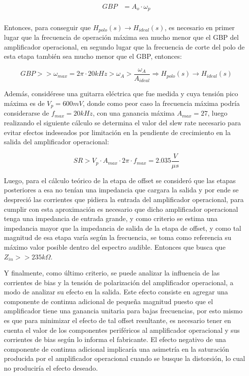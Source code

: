 \begin{align*}
    GBP & = A_o \cdot \omega_p\\
\end{align*}


Entonces, para conseguir que $H_{polo}(s) \rightarrow H_{ideal}(s)$, es necesario en primer lugar que la frecuencia de operaci\'on m\'axima sea mucho menor
que el GBP del amplificador operacional, en segundo lugar que la frecuencia de corte del polo de esta etapa tambi\'en sea mucho menor que el GBP, entonces:


\begin{equation}
    GBP >> \omega_{max} = 2 \pi \cdot 20kHz > \omega_A > \frac{\omega_A}{A_{ideal}}
    \Rightarrow H_{polo}(s) \rightarrow H_{ideal}(s)
\end{equation}

Adem\'as, consid\'erese una guitarra el\'ectrica que fue medida y cuya tensi\'on pico m\'axima es de $V_p = 600mV$, donde como peor caso la frecuencia m\'axima
podr\'ia considerarse de $f_{max} = 20kHz$, con una ganancia m\'axima $A_{max} = 27$, luego realizando el siguiente c\'alculo se determina el valor del slew rate necesario
para evitar efectos indeseados por limitaci\'on en la pendiente de crecimiento en la salida del amplificador operacional:

\begin{equation}
    SR > V_p \cdot A_{max} \cdot 2 \pi \cdot f_{max} = 2.035 \frac{V}{\mu s}
\end{equation}

Luego, para el c\'alculo te\'orico de la etapa de offset se consider\'o que las etapas posteriores a esa no ten\'ian una impedancia que cargara la salida y por ende
se despreci\'o las corrientes que pidiera la entrada del amplificador operacional, para cumplir con esta aproximaci\'on es necesario que dicho amplificador operacional tenga una impedancia de entrada grande, y como criterio
se estima una impedancia mayor que la impedancia de salida de la etapa de offset, y como tal magnitud de esa etapa var\'ia seg\'un la frecuencia, se toma como referencia su m\'aximo valor
posible dentro del espectro audible. Entonces que busca que $Z_{in} >> 235 k \Omega$.

Y finalmente, como \'ultimo criterio, se puede analizar la influencia de las corrientes de bias y la tensi\'on de polarizaci\'on del amplificador operacional, a modo de analizar su efecto en la salida. Este efecto
consiste en agregar una componente de continua adicional de peque\~na magnitud puesto que el amplificador tiene una ganancia unitaria para bajas frecuencias, por esto mismo es que para minimizar el efecto de tal offset resultante,
es necesario tener en cuenta el valor de los componentes perif\'ericos al amplificador operacional y sus corrientes de bias seg\'un lo informa el fabricante. El efecto negativo de una componente de continua adicional implicar\'ia una asimetr\'ia en la saturaci\'on
producida por el amplificador operacional cuando se busque la distorsi\'on, lo cual no producir\'ia el efecto deseado.

